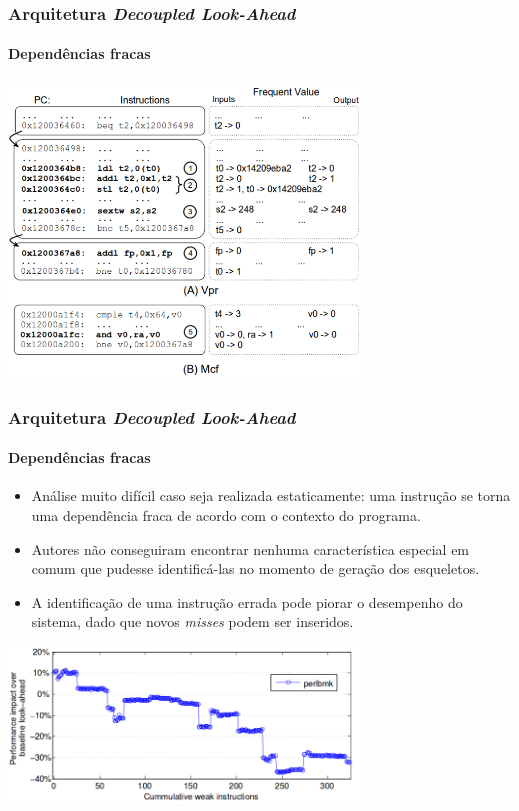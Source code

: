 \documentclass[10pt]{beamer}
\begin{document}
\begin{frame}
\frametitle{Arquitetura \textit{Decoupled Look-Ahead}}
\framesubtitle{Dependências fracas}

\centering
\includegraphics[width=0.7\textwidth]{images/example}

\end{frame}

\begin{frame}
\frametitle{Arquitetura \textit{Decoupled Look-Ahead}}
\framesubtitle{Dependências fracas}

\begin{itemize}
 \item Análise muito difícil caso seja realizada estaticamente: uma
instrução se torna uma dependência fraca de acordo com o contexto do
programa.
\item Autores não conseguiram encontrar nenhuma
característica especial em comum que pudesse identificá-las no
momento de geração dos esqueletos. 

\item A identificação de uma instrução errada pode piorar o desempenho do
sistema, dado que novos \textit{misses} podem ser inseridos.
\end{itemize}

\centering
\includegraphics[width=0.7\textwidth]{images/low}

\end{frame}
\end{document}
